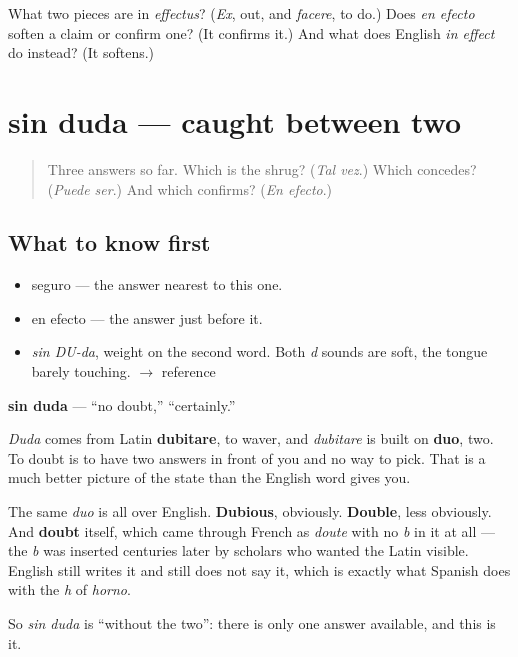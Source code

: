 \begin{tcolorbox}[breakable,colback=teal!4,colframe=teal!35!black,title={Before you move on}]
What two pieces are in \emph{effectus}? (\emph{Ex}, out, and \emph{facere}, to do.) Does \emph{en efecto} soften a claim or confirm one? (It confirms it.) And what does English \emph{in effect} do instead? (It softens.)
\end{tcolorbox}
\section[sin duda]{sin duda — caught between two}

\label{lesson:ES-C298-sin-duda}



\begin{quote}
Three answers so far. Which is the shrug? (\emph{Tal vez}.) Which concedes? (\emph{Puede ser}.) And which confirms? (\emph{En efecto}.)
\end{quote}

\subsection*{What to know first}
\begin{itemize}
\raggedright
  \item seguro — the answer nearest to this one.
  \item en efecto — the answer just before it.
\end{itemize}

\begin{sounds}
\begin{itemize}
\raggedright
  \item \emph{sin DU-da}, weight on the second word. Both \emph{d} sounds are soft, the tongue barely touching. $\to$ reference
\end{itemize}
\end{sounds}

\begin{cousinweb}
\textbf{sin duda} — \textquotedblleft{}no doubt,\textquotedblright{} \textquotedblleft{}certainly.\textquotedblright{}

\emph{Duda} comes from Latin \textbf{dubitare}, to waver, and \emph{dubitare} is built on \textbf{duo}, two. To doubt is to have two answers in front of you and no way to pick. That is a much better picture of the state than the English word gives you.

The same \emph{duo} is all over English. \textbf{Dubious}, obviously. \textbf{Double}, less obviously. And \textbf{doubt} itself, which came through French as \emph{doute} with no \emph{b} in it at all — the \emph{b} was inserted centuries later by scholars who wanted the Latin visible. English still writes it and still does not say it, which is exactly what Spanish does with the \emph{h} of \emph{horno}.

So \emph{sin duda} is \textquotedblleft{}without the two\textquotedblright{}: there is only one answer available, and this is it.
\end{cousinweb}

